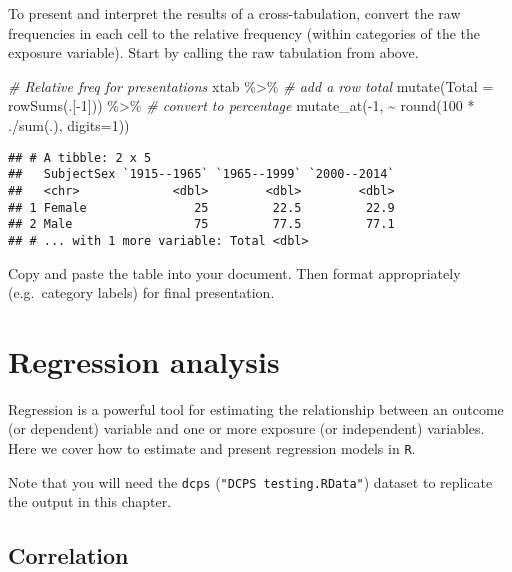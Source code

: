 \documentclass[
  12pt,
]{krantz}
\newenvironment{Shaded}{\begin{snugshade}}{\end{snugshade}}
\newcommand{\AttributeTok}[1]{\textcolor[rgb]{0.77,0.63,0.00}{#1}}
\newcommand{\CommentTok}[1]{\textcolor[rgb]{0.56,0.35,0.01}{\textit{#1}}}
\newcommand{\DecValTok}[1]{\textcolor[rgb]{0.00,0.00,0.81}{#1}}
\newcommand{\FunctionTok}[1]{\textcolor[rgb]{0.00,0.00,0.00}{#1}}
\newcommand{\NormalTok}[1]{#1}
\newcommand{\SpecialCharTok}[1]{\textcolor[rgb]{0.00,0.00,0.00}{#1}}
\begin{document}
To present and interpret the results of a cross-tabulation, convert the raw frequencies in each cell to the relative frequency (within categories of the the exposure variable). Start by calling the raw tabulation from above.

\begin{Shaded}
\begin{Highlighting}[]
\CommentTok{\# Relative freq for presentations  }
\NormalTok{  xtab }\SpecialCharTok{\%\textgreater{}\%}
  \CommentTok{\# add a row total}
    \FunctionTok{mutate}\NormalTok{(}\AttributeTok{Total =} \FunctionTok{rowSums}\NormalTok{(.[}\SpecialCharTok{{-}}\DecValTok{1}\NormalTok{])) }\SpecialCharTok{\%\textgreater{}\%}
  \CommentTok{\# convert to percentage}
    \FunctionTok{mutate\_at}\NormalTok{(}\SpecialCharTok{{-}}\DecValTok{1}\NormalTok{, }\SpecialCharTok{\textasciitilde{}} \FunctionTok{round}\NormalTok{(}\DecValTok{100} \SpecialCharTok{*}\NormalTok{ .}\SpecialCharTok{/}\FunctionTok{sum}\NormalTok{(.), }\AttributeTok{digits=}\DecValTok{1}\NormalTok{))}
\end{Highlighting}
\end{Shaded}

\begin{verbatim}
## # A tibble: 2 x 5
##   SubjectSex `1915--1965` `1965--1999` `2000--2014`
##   <chr>             <dbl>        <dbl>        <dbl>
## 1 Female               25         22.5         22.9
## 2 Male                 75         77.5         77.1
## # ... with 1 more variable: Total <dbl>
\end{verbatim}

Copy and paste the table into your document. Then format appropriately (e.g.~category labels) for final presentation.

\hypertarget{regression-analysis}{%
\chapter{Regression analysis}\label{regression-analysis}}

Regression is a powerful tool for estimating the relationship between an outcome (or dependent) variable and one or more exposure (or independent) variables. Here we cover how to estimate and present regression models in \texttt{R}.

Note that you will need the \texttt{dcps} (\texttt{"DCPS\ testing.RData"}) dataset to replicate the output in this chapter.

\hypertarget{correlation}{%
\section{Correlation}\label{correlation}}
\end{document}
